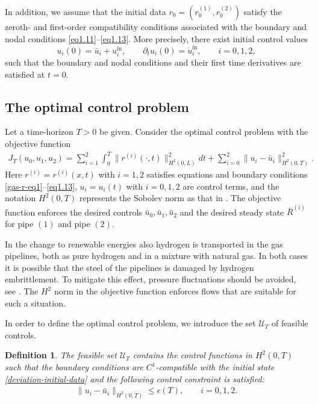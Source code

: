 \documentclass[12pt]{article}
\newtheorem{definition}{Definition}[section]%
\numberwithin{equation}{section}
\begin{document}
In addition, we assume that the initial data $r_0=(r_0^{(1)},r_0^{(2)})$ satisfy the zeroth- and first-order compatibility conditions associated with
the boundary and nodal conditions
\eqref{eq1.11}--\eqref{eq1.13}. More precisely, there exist
initial control values
\[
u_i(0) = \bar{u}_i+u_i^{\mathrm{in}},\qquad \partial_t u_i(0)=\dot u_i^{\mathrm{in}},
\qquad i=0,1,2,
\]
such that the boundary and nodal conditions and their first time
derivatives are satisfied at $t=0$. 

\subsection{The optimal control problem}
Let a time-horizon $T>0$ be given. 
Consider the optimal control problem with the objective function
\begin{align}\label{objective-func}
J_T(u_0, u_1, u_2)= \sum_{i=1}^2\int_0^T \|r^{(i)}(\cdot,t)\|^2_{H^2(0,L)} dt + \sum_{i=0}^2 \|u_i-\bar{u}_i\|_{H^2(0,T)}^2.
\end{align}
Here $r^{(i)}=r^{(i)}(x,t)$ with $i=1,2$ satisfies equations and boundary conditions \eqref{gas-r-eq1}--\eqref{eq1.13}, $u_{i}=u_{i}(t)$ with $i=0,1,2$ are control terms, and the notation 
$H^2(0,T)$ represents the Sobolev norm as that in \cite{Coron-book}.
The objective function enforces the desired controls $\bar{u}_0,\bar{u}_1,\bar{u}_2$ and the desired steady state $\bar{R}^{(i)}$ for pipe $(1)$ and pipe $(2)$.

In the  change to renewable energies
also hydrogen is transported in the gas pipelines,
both as pure hydrogen and in a mixture with natural gas.
In both cases it is possible that the
steel of the pipelines is damaged
by hydrogen embrittlement.
To mitigate this effect, 
pressure fluctuations should be avoided, see \cite{laureys2022use,xing2017atomistic}.
The $H^2$ norm in the  objective function enforces  flows 
that are suitable for such a situation. 

In order to define the optimal control problem, we introduce the set $\mathcal{U}_T$ of feasible controls. 
\begin{definition}
The feasible set $\mathcal{U}_T$ contains the control functions in $H^2(0,T)$ such that the boundary conditions are $C^1$-compatible with the initial state \eqref{deviation-initial-data} and the following control constraint is satisfied: 
\begin{align}\label{control-constraint1}
\|u_i -\bar{u}_i\|_{H^2(0,T)}\leq \epsilon(T),\qquad i=0,1,2.
\end{align}
\end{definition}
\end{document}
